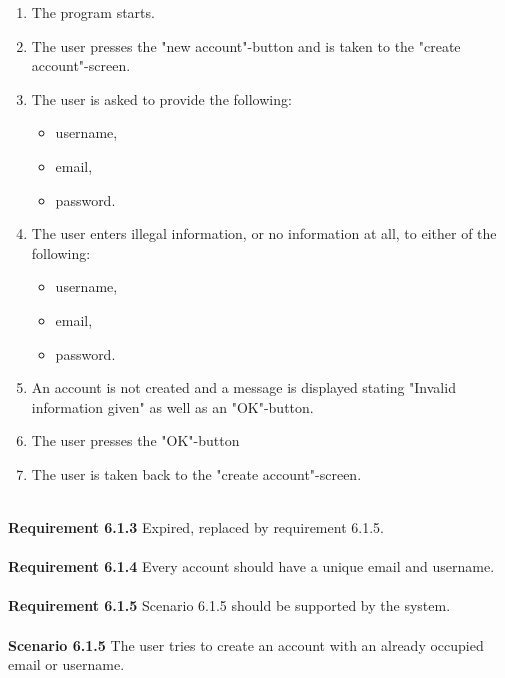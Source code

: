 \documentclass{article}
\begin{document}
\begin{enumerate}
    \item The program starts.
    \item The user presses the "new account"-button and is taken to the "create account"-screen.
   \item The user is asked to provide the following:
        \begin{itemize}
            \item username,
            \item email,
            \item password.
        \end{itemize}
    \item The user enters illegal information, or no information at all, to either of the following: 
        \begin{itemize}
            \item username,
            \item email,
            \item password.
        \end{itemize}
    \item An account is not created and a message is displayed stating "Invalid information given" as well as an "OK"-button. 
    \item The user presses the "OK"-button 
    \item The user is taken back to the "create account"-screen.
\end{enumerate}
\mbox{}\\
\textbf{Requirement 6.1.3} Expired, replaced by requirement 6.1.5.
\\ \\
\textbf{Requirement 6.1.4} Every account should have a unique email and username.
\\ \\
\textbf{Requirement 6.1.5} Scenario 6.1.5 should be supported by the system.
\\ \\
\textbf{Scenario 6.1.5} The user tries to create an account with an already occupied email or username.
\\ 
\end{document}
